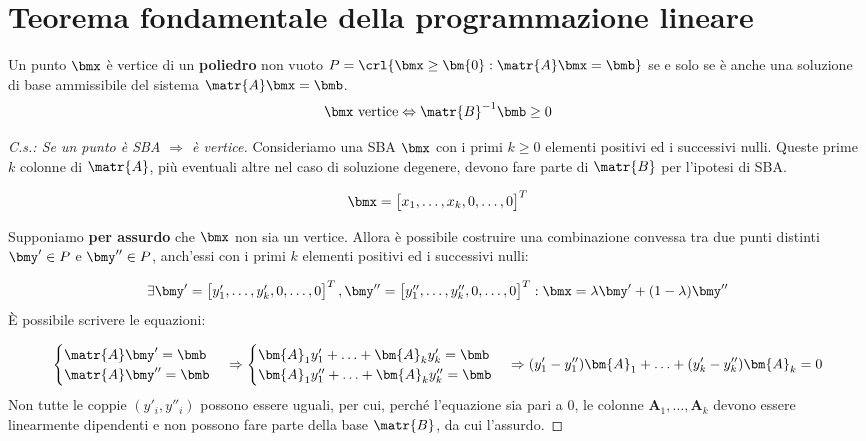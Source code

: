 \documentclass[\main/main.tex]{subfiles}
\begin{document}
\section{Teorema fondamentale della programmazione lineare}

\begin{theorem}
  Un punto $\bmx$ è vertice di un \textbf{poliedro} non vuoto $P=\crl{\bmx \geq \bm{0} : \matr{A}\bmx = \bmb}$ se e solo se è anche una soluzione di base ammissibile del sistema $\matr{A}\bmx = \bmb$.
  \[
    \bmx \text{ vertice} \Leftrightarrow \matr{B}^{-1}\bmb\geq 0
  \]
\end{theorem}

\begin{proof}[C.s.: Se un punto è SBA $\Rightarrow$ è vertice]
  Consideriamo una SBA $\bmx$ con i primi $k \geq 0$ elementi positivi ed i successivi nulli. Queste prime $k$ colonne di $\matr{A}$, più eventuali altre nel caso di soluzione degenere, devono fare parte di $\matr{B}$ per l'ipotesi di SBA.

  \[
    \bmx = \begin{bmatrix}
      x_1, \ldots, x_k, 0, \ldots, 0
    \end{bmatrix}^T
  \]

  Supponiamo \textbf{per assurdo} che $\bmx$ non sia un vertice. Allora è possibile costruire una combinazione convessa tra due punti distinti $\bmy' \in P$ e $\bmy'' \in P$, anch'essi con i primi $k$ elementi positivi ed i successivi nulli:

  \[
    \exists \bmy' = \begin{bmatrix}
      y'_1, \ldots, y'_k, 0, \ldots, 0
    \end{bmatrix}^T,
    \bmy'' = \begin{bmatrix}
      y''_1, \ldots, y''_k, 0, \ldots, 0
    \end{bmatrix}^T:
    \bmx = \lambda \bmy' + (1-\lambda)\bmy''
  \]
  È possibile scrivere le equazioni:

  \[
    \begin{cases}
      \matr{A}\bmy' = \bmb  \\
      \matr{A}\bmy'' = \bmb \\
    \end{cases}
    \Rightarrow
    \begin{cases}
      \bm{A}_1y'_1 + \ldots + \bm{A}_ky'_k = \bmb   \\
      \bm{A}_1y''_1 + \ldots + \bm{A}_ky''_k = \bmb \\
    \end{cases}
    \Rightarrow
    (y'_1 - y''_1)\bm{A}_1 + \ldots + (y'_k -y''_k)\bm{A}_k = 0
  \]
  Non tutte le coppie $(y'_i, y''_i)$ possono essere uguali, per cui, perché l'equazione sia pari a $0$, le colonne $\bm{A}_1, \ldots, \bm{A}_k$ devono essere linearmente dipendenti e non possono fare parte della base $\matr{B}$, da cui l'assurdo.
\end{proof}
\end{document}
